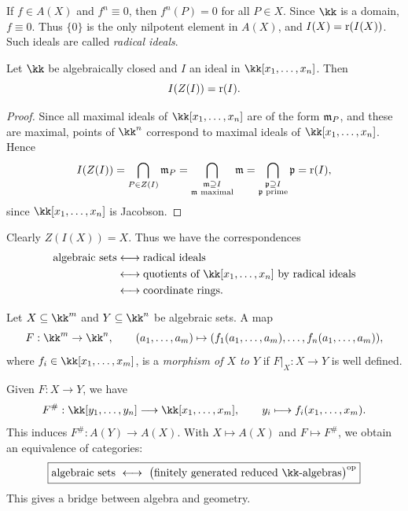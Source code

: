 \documentclass[11pt,a4paper]{article}
\begin{document}
If $f\in A(X)$ and $f^n\equiv0$, then $f^n(P)=0$ for all $P\in X$. Since $\kk$ is a domain, $f\equiv0$. Thus $\{0\}$ is the only nilpotent element in $A(X)$, and $I(X)=\mathrm r(I(X))$. Such ideals are called \emph{radical ideals}.
\setcounter{theorem}{28}\begin{theorem}
Let $\kk$ be algebraically closed and $I$ an ideal in $\kk[x_1,\ldots,x_n]$. Then
\[I(Z(I))=\mathrm r(I).\]
\end{theorem}
\begin{proof}
Since all maximal ideals of $\kk[x_1,\ldots,x_n]$ are of the form $\mathfrak m_P$, and these are maximal, points of $\kk^n$ correspond to maximal ideals of $\kk[x_1,\ldots,x_n]$. Hence
\[
I(Z(I))=\bigcap_{P\in Z(I)}\mathfrak m_P
=\bigcap_{\substack{\mathfrak m\supseteq I\\\mathfrak m\text{ maximal}}}\mathfrak m
=\bigcap_{\substack{\mathfrak p\supseteq I\\\mathfrak p\text{ prime}}}\mathfrak p
=\mathrm r(I),
\]
since $\kk[x_1,\ldots,x_n]$ is Jacobson.
\end{proof}
\begin{remark}
Clearly $Z(I(X))=X$. Thus we have the correspondences
\[
\begin{aligned}
\text{algebraic sets}&\longleftrightarrow\text{radical ideals}\\
&\longleftrightarrow\text{quotients of }\kk[x_1,\ldots,x_n]\text{ by radical ideals}\\
&\longleftrightarrow\text{coordinate rings}.
\end{aligned}
\]
\end{remark}
\setcounter{definition}{15}\begin{definition}
Let $X\subseteq\kk^m$ and $Y\subseteq\kk^n$ be algebraic sets. A map
\[
F:\kk^m\to\kk^n,\qquad
(a_1,\ldots,a_m)\mapsto(f_1(a_1,\ldots,a_m),\ldots,f_n(a_1,\ldots,a_m)),
\]
where $f_i\in\kk[x_1,\ldots,x_m]$, is a \emph{morphism of $X$ to $Y$} if $F|_X:X\to Y$ is well defined.
\end{definition}
Given $F:X\to Y$, we have
\[
F^{\#}:\kk[y_1,\ldots,y_n]\longrightarrow\kk[x_1,\ldots,x_m],
\qquad y_i\longmapsto f_i(x_1,\ldots,x_m).
\]
This induces $F^{\#}:A(Y)\to A(X)$. With $X\mapsto A(X)$ and $F\mapsto F^{\#}$, we obtain an equivalence of categories:
\[
\boxed{\text{algebraic sets}\ \longleftrightarrow\ \bigl(\text{finitely generated reduced }\kk\text{-algebras}\bigr)^{\mathrm{op}}}
\]
This gives a bridge between algebra and geometry.
\end{document}
